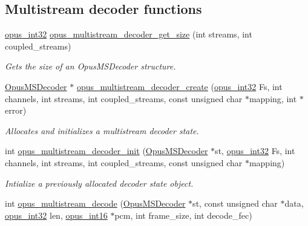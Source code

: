 \subsection*{Multistream decoder functions}
\label{_amgrpcc7358059c41f41af9a3b9b2f9644064}
 \begin{DoxyCompactItemize}
\item 
\hyperlink{opus__types_8h_aa4d309d6f80b99dbabebc8f98879ab9a}{opus\_\-int32} \hyperlink{group__opus__multistream_ga38d745963e7903890c80278bc2569c39}{opus\_\-multistream\_\-decoder\_\-get\_\-size} (int streams, int coupled\_\-streams)
\begin{DoxyCompactList}\small\item\em Gets the size of an {\ttfamily OpusMSDecoder} structure. \item\end{DoxyCompactList}\item 
\hyperlink{group__opus__multistream_gad3497495deb9a8ace82e76cd4f93e0e4}{OpusMSDecoder} $\ast$ \hyperlink{group__opus__multistream_ga3c0e342774174c471e61cedba53755c9}{opus\_\-multistream\_\-decoder\_\-create} (\hyperlink{opus__types_8h_aa4d309d6f80b99dbabebc8f98879ab9a}{opus\_\-int32} Fs, int channels, int streams, int coupled\_\-streams, const unsigned char $\ast$mapping, int $\ast$error)
\begin{DoxyCompactList}\small\item\em Allocates and initializes a multistream decoder state. \item\end{DoxyCompactList}\item 
int \hyperlink{group__opus__multistream_ga09a4d14fc497d4f6fbe76bd1c5d45436}{opus\_\-multistream\_\-decoder\_\-init} (\hyperlink{group__opus__multistream_gad3497495deb9a8ace82e76cd4f93e0e4}{OpusMSDecoder} $\ast$st, \hyperlink{opus__types_8h_aa4d309d6f80b99dbabebc8f98879ab9a}{opus\_\-int32} Fs, int channels, int streams, int coupled\_\-streams, const unsigned char $\ast$mapping)
\begin{DoxyCompactList}\small\item\em Intialize a previously allocated decoder state object. \item\end{DoxyCompactList}\item 
int \hyperlink{group__opus__multistream_gaa4b89541efe01970cf52e4a336db3ad0}{opus\_\-multistream\_\-decode} (\hyperlink{group__opus__multistream_gad3497495deb9a8ace82e76cd4f93e0e4}{OpusMSDecoder} $\ast$st, const unsigned char $\ast$data, \hyperlink{opus__types_8h_aa4d309d6f80b99dbabebc8f98879ab9a}{opus\_\-int32} len, \hyperlink{opus__types_8h_acc9ed7cf60479eb81f9648c6ec27dc26}{opus\_\-int16} $\ast$pcm, int frame\_\-size, int decode\_\-fec)

\end{DoxyCompactItemize}
